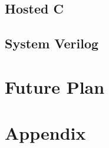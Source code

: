 \documentclass[12pt,twoside,a4paper]{report}
\begin{document}
    \section{Hosted C}
    
    \section{System Verilog}
    
    \chapter{Future Plan}
    
    \begin{thebibliography}{10}
    
    \end{thebibliography}
    
    \chapter*{Appendix}
     
\end{document}
